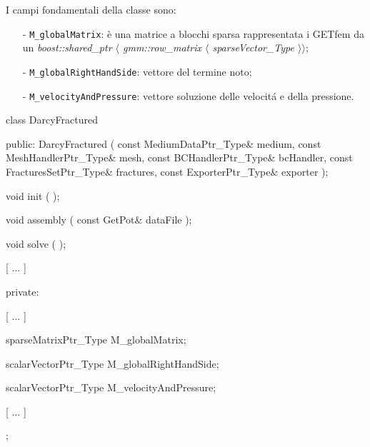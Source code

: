 \noindent I campi fondamentali della classe sono:
	\begin{enumerate}
	\item[-] \texttt{M\_globalMatrix}: \`{e} una matrice a blocchi sparsa rappresentata i GETfem da un \textit{boost::shared\_ptr $\langle$ gmm::row\_matrix $\langle$ sparseVector\_Type $\rangle \rangle$};
	\item[-] \texttt{M\_globalRightHandSide}: vettore del termine noto;
	\item[-] \texttt{M\_velocityAndPressure}: vettore soluzione delle velocit\'{a} e della pressione.
	\end{enumerate} 

\begin{Code03_04}[caption={Classe \texttt{DarcyFracture}}]
class DarcyFractured
{
 public:
    DarcyFractured ( const MediumDataPtr_Type& medium,
                     const MeshHandlerPtr_Type& mesh,
                     const BCHandlerPtr_Type& bcHandler,
                     const FracturesSetPtr_Type& fractures,
                     const ExporterPtr_Type& exporter );
    
    void init ( );
    
    void assembly ( const GetPot& dataFile );

    void solve ( );

	[ ... ]

 private:

	[ ... ]

    sparseMatrixPtr_Type M_globalMatrix;

    scalarVectorPtr_Type M_globalRightHandSide;

    scalarVectorPtr_Type M_velocityAndPressure;

    [ ... ]
};
\end{Code03_04}

